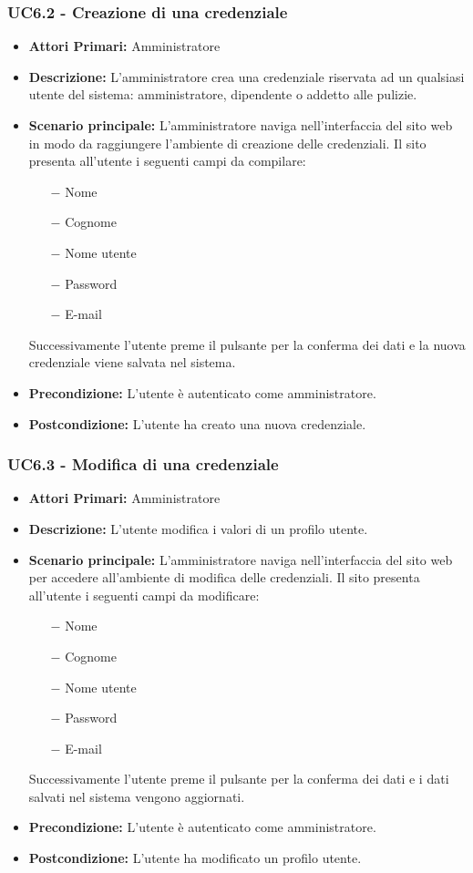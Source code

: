 \subsubsection{ UC6.2 - Creazione di una credenziale}
\begin{itemize}
	\item\textbf{Attori Primari:}
	Amministratore 
	\item\textbf{Descrizione:} 
	L'amministratore crea una credenziale riservata ad un qualsiasi utente del sistema: amministratore, dipendente o addetto alle pulizie.
	\item\textbf{Scenario principale:} 
	L'amministratore naviga nell'interfaccia del sito web in modo da raggiungere l'ambiente di creazione delle credenziali.
	Il sito presenta all'utente i seguenti campi da compilare:
	\begin{itemize}
		\item[$-$] Nome
		\item[$-$] Cognome
		\item[$-$] Nome utente
		\item[$-$] Password
		\item[$-$] E-mail
	\end{itemize}
	Successivamente l'utente preme il pulsante per la conferma dei dati e la nuova credenziale viene salvata nel sistema.
	\item\textbf{Precondizione:} 
	L'utente è autenticato come amministratore.
	\item\textbf{Postcondizione:}
	L'utente ha creato una nuova credenziale.
\end{itemize}

\subsubsection{ UC6.3 - Modifica di una credenziale}
\begin{itemize}
	\item\textbf{Attori Primari:} 
	Amministratore
	\item\textbf{Descrizione:} 
	L'utente modifica i valori di un profilo utente.
	\item\textbf{Scenario principale:} 
	L'amministratore naviga nell'interfaccia del sito web per accedere all'ambiente di modifica delle credenziali.
	Il sito presenta all'utente i seguenti campi da modificare:
	\begin{itemize}
		\item[$-$] Nome
		\item[$-$] Cognome
		\item[$-$] Nome utente
		\item[$-$] Password
		\item[$-$] E-mail
	\end{itemize}
	Successivamente l'utente preme il pulsante per la conferma dei dati e i dati salvati nel sistema vengono aggiornati.
	\item\textbf{Precondizione:} 
	L'utente è autenticato come amministratore.
	\item\textbf{Postcondizione:}
	L'utente ha modificato un profilo utente.
\end{itemize}

